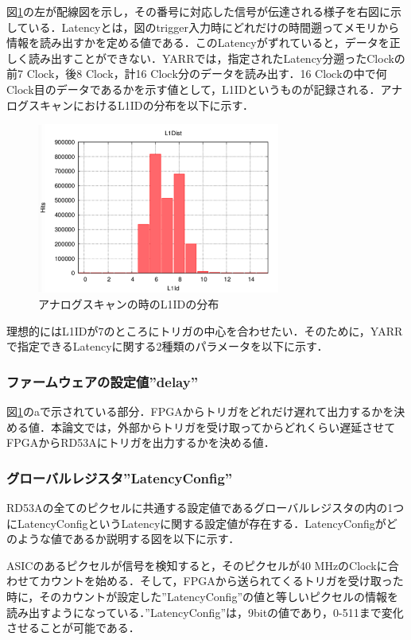 図\ref{fig:YARRDAQ}の左が配線図を示し，その番号に対応した信号が伝達される様子を右図に示している．Latencyとは，図のtrigger入力時にどれだけの時間遡ってメモリから情報を読み出すかを定める値である．このLatencyがずれていると，データを正しく読み出すことができない．YARRでは，指定されたLatency分遡ったClockの前7 $\mathrm{Clock}$，後8 $\mathrm{Clock}$，計16 $\mathrm{Clock}$分のデータを読み出す．16 $\mathrm{Clock}$の中で何 $\mathrm{Clock}$目のデータであるかを示す値として，L1IDというものが記録される．アナログスキャンにおけるL1IDの分布を以下に示す．\par
\begin{figure}[h]
  \centering
  \includegraphics[width=8cm]{./figure/l1dist.png}
  \caption{アナログスキャンの時のL1IDの分布}
  \label{fig:YARRDAQ}
\end{figure}

理想的にはL1IDが7のところにトリガの中心を合わせたい．そのために，YARRで指定できるLatencyに関する2種類のパラメータを以下に示す．

%

\subsubsection*{ファームウェアの設定値''delay''}
図\ref{fig:YARRDAQ}のaで示されている部分．FPGAからトリガをどれだけ遅れて出力するかを決める値．本論文では，外部からトリガを受け取ってからどれくらい遅延させてFPGAからRD53Aにトリガを出力するかを決める値．

\subsubsection*{グローバルレジスタ''LatencyConfig''}
RD53Aの全てのピクセルに共通する設定値であるグローバルレジスタの内の1つにLatencyConfigというLatencyに関する設定値が存在する．LatencyConfigがどのような値であるか説明する図を以下に示す．\par
ASICのあるピクセルが信号を検知すると，そのピクセルが40 $\mathrm{MHz}$のClockに合わせてカウントを始める．そして，FPGAから送られてくるトリガを受け取った時に，そのカウントが設定した''LatencyConfig''の値と等しいピクセルの情報を読み出すようになっている．''LatencyConfig''は，9bitの値であり，0-511まで変化させることが可能である．

